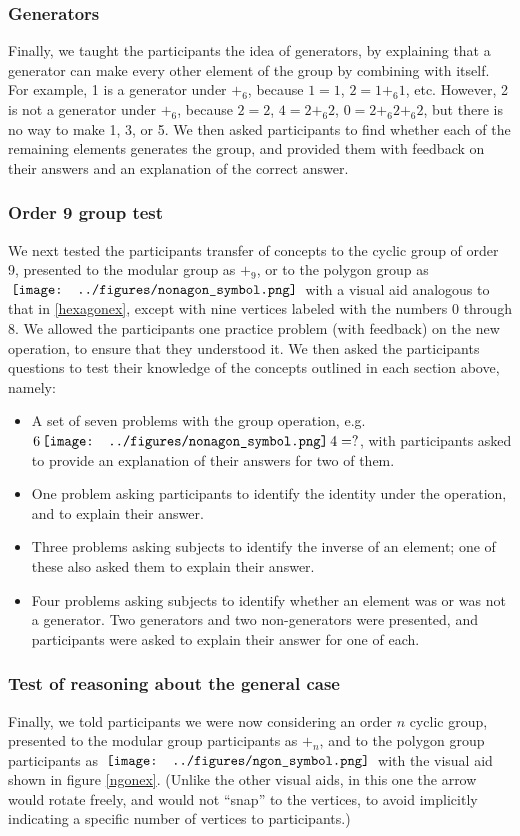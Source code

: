 \documentclass[man,10pt]{apa6}
\newcommand{\nonagon}{\,\vcenter{\hbox{\texttt{[image: ../figures/nonagon\_symbol.png]}}}\,}
\newcommand{\ngon}{\,\vcenter{\hbox{\texttt{[image: ../figures/ngon\_symbol.png]}}}\,}
\begin{document}
\subsubsection{Generators}
Finally, we taught the participants the idea of generators, by explaining that a generator can make every other element of the group by combining with itself. For example, 1 is a generator under $+_6$, because $1 = 1$, $2 = 1 +_6 1$, etc. However, 2 is not a generator under $+_6$, because $2 = 2$, $4 = 2 +_6 2$, $0 = 2 +_6 2 +_6 2$, but there is no way to make 1, 3, or 5. We then asked participants to find whether each of the remaining elements generates the group, and provided them with feedback on their answers and an explanation of the correct answer.
\subsubsection{Order 9 group test}
We next tested the participants transfer of concepts to the cyclic group of order 9, presented to the modular group as $+_9$, or to the polygon group as $\nonagon$ with a visual aid analogous to that in \ref{hexagonex}, except with nine vertices labeled with the numbers 0 through 8. We allowed the participants one practice problem (with feedback) on the new operation, to ensure that they understood it. We then asked the participants questions to test their knowledge of the concepts outlined in each section above, namely:
\begin{itemize} 
\item A set of seven problems with the group operation, e.g. $6 \nonagon 4 = ?$, with participants asked to provide an explanation of their answers for two of them. 
\item One problem asking participants to identify the identity under the operation, and to explain their answer.
\item Three problems asking subjects to identify the inverse of an element; one of these also asked them to explain their answer.
\item Four problems asking subjects to identify whether an element was or was not a generator. Two generators and two non-generators were presented, and participants were asked to explain their answer for one of each.
\end{itemize}
\subsubsection{Test of reasoning about the general case}
Finally, we told participants we were now considering an order $n$ cyclic group, presented to the modular group participants as $+_n$, and to the polygon group participants as $\ngon$ with the visual aid shown in figure \ref{ngonex}. (Unlike the other visual aids, in this one the arrow would rotate freely, and would not ``snap'' to the vertices, to avoid implicitly indicating a specific number of vertices to participants.) 
\end{document}
